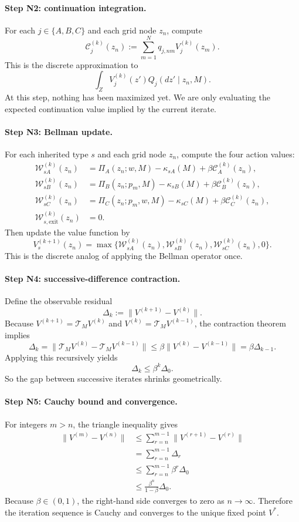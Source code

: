 \paragraph{Step N2: continuation integration.}
For each $j\in\{A,B,C\}$ and each grid node $z_n$, compute
\[
\mathcal C_j^{(k)}(z_n):=\sum_{m=1}^N q_{j,nm}V_j^{(k)}(z_m).
\]
This is the discrete approximation to
\[
\int_Z V_j^{(k)}(z')Q_j(dz'\mid z_n,M).
\]
At this step, nothing has been maximized yet. We are only evaluating the expected continuation value implied by the current iterate.

\paragraph{Step N3: Bellman update.}
For each inherited type $s$ and each grid node $z_n$, compute the four action values:
\begin{align*}
\mathcal W_{sA}^{(k)}(z_n)&=\Pi_A(z_n;w,M)-\kappa_{sA}(M)+\beta \mathcal C_A^{(k)}(z_n),\\
\mathcal W_{sB}^{(k)}(z_n)&=\Pi_B(z_n;p_m,M)-\kappa_{sB}(M)+\beta \mathcal C_B^{(k)}(z_n),\\
\mathcal W_{sC}^{(k)}(z_n)&=\Pi_C(z_n;p_m,w,M)-\kappa_{sC}(M)+\beta \mathcal C_C^{(k)}(z_n),\\
\mathcal W_{s,\mathrm{exit}}^{(k)}(z_n)&=0.
\end{align*}
Then update the value function by
\[
V_s^{(k+1)}(z_n)=\max\bigl\{\mathcal W_{sA}^{(k)}(z_n),\mathcal W_{sB}^{(k)}(z_n),\mathcal W_{sC}^{(k)}(z_n),0\bigr\}.
\]
This is the discrete analog of applying the Bellman operator once.

\paragraph{Step N4: successive-difference contraction.}
Define the observable residual
\[
\Delta_k:=\|V^{(k+1)}-V^{(k)}\|.
\]
Because $V^{(k+1)}=\mathcal T_MV^{(k)}$ and $V^{(k)}=\mathcal T_MV^{(k-1)}$, the contraction theorem implies
\[
\Delta_k
=
\|\mathcal T_MV^{(k)}-\mathcal T_MV^{(k-1)}\|
\le \beta\|V^{(k)}-V^{(k-1)}\|
=\beta\Delta_{k-1}.
\]
Applying this recursively yields
\[
\Delta_k\le \beta^k\Delta_0.
\]
So the gap between successive iterates shrinks geometrically.

\paragraph{Step N5: Cauchy bound and convergence.}
For integers $m>n$, the triangle inequality gives
\begin{align*}
\|V^{(m)}-V^{(n)}\|
&\le \sum_{r=n}^{m-1}\|V^{(r+1)}-V^{(r)}\|\\
&= \sum_{r=n}^{m-1}\Delta_r\\
&\le \sum_{r=n}^{m-1}\beta^r\Delta_0\\
&\le \frac{\beta^n}{1-\beta}\Delta_0.
\end{align*}
Because $\beta\in(0,1)$, the right-hand side converges to zero as $n\to\infty$. Therefore the iteration sequence is Cauchy and converges to the unique fixed point $V^*$.

